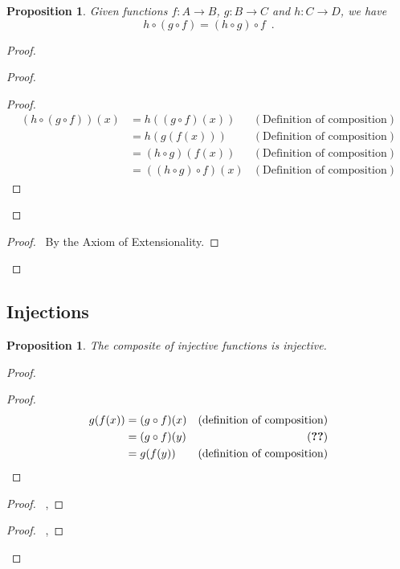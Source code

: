 \documentclass{book}
\let\qed\relax
\newtheorem{prop}[ax]{Proposition}
\theoremstyle{definition}
\begin{document}
\begin{prop}
Given functions $f : A \rightarrow B$, $g : B \rightarrow C$ and $h : C \rightarrow D$, we have
\[ h \circ (g \circ f) = (h \circ g) \circ f \enspace . \]
\end{prop}

\begin{proof}
\pf
{}
\begin{proof}
	\begin{proof}
		\pf
		\begin{align*}
			(h \circ (g \circ f))(x)
			& = h ((g \circ f)(x)) & (\text{Definition of composition}) \\
			& = h(g(f(x))) & (\text{Definition of composition}) \\
			& = (h \circ g)(f(x)) & (\text{Definition of composition}) \\
			& = ((h \circ g) \circ f)(x) & (\text{Definition of composition})
		\end{align*}
	\end{proof}
\end{proof}
\qedstep
\begin{proof}
	\pf\ By the Axiom of Extensionality.
\end{proof}
\qed
\end{proof}

\subsection{Injections} %

\begin{prop}
\label{prop:comp_inj}
The composite of injective functions is injective.
\end{prop}

\begin{proof}
\pf
{}
\begin{proof}
	\pf
	\begin{align*}
		g(f(x)) & = (g \circ f)(x) & (\text{definition of composition}) \\
		& = (g \circ f)(y) & (\text{\stepref{7}}) \\
		& = g(f(y))& (\text{definition of composition})
	\end{align*}
\end{proof}
\begin{proof}
	\pf\ , 
\end{proof}
\begin{proof}
	\pf\ , 
\end{proof}
\qed
\end{proof}
\end{document}
